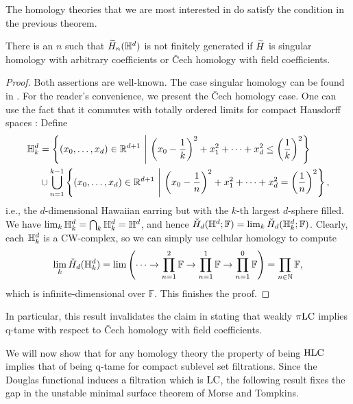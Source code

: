 The homology theories that we are most interested in do satisfy the condition in the previous theorem.

\begin{prop}
	There is an $n$ such that $\widetilde{H}_{n}(\mathbb{H}^d)$ is not finitely generated if $\widetilde{H}$ is singular homology with arbitrary coefficients or \v{C}ech homology with field coefficients.
\end{prop}

\begin{proof}
	Both assertions are well-known. The case singular homology can be found in \cite{Barratt.1962}. For the reader's convenience, we present the \v{C}ech homology case.
	One can use the fact that it commutes with totally ordered limits for compact Hausdorff spaces \cite[Theorems VIII.3.6.\@ and X.3.1.]{MR0050886}:
	Define 
	\begin{align*}
	\HE_k &= \left\{ (x_0, \dots, x_d) \in \R^{d+1} \ \middle|\  \left( x_0 - \frac{1}{k} \right)^2 + x_1^2 + \dots + x_d^2 \leq \left( \frac{1}{k} \right)^2 \right\} \\
	& \cup \bigcup_{n=1}^{k-1} \left\{ (x_0, \dots, x_d) \in \R^{d+1} \ \middle|\  \left( x_0 - \frac{1}{n} \right)^2 + x_1^2 + \dots + x_d^2 = \left( \frac{1}{n} \right)^2 \right \},
	\end{align*}
	i.e., the $d$-dimensional Hawaiian earring but with the $k$-th largest $d$-sphere filled.
	We have $\lim_{k} \mathbb{H}^d_{k} = \bigcap_{k} \mathbb{H}^d_{k} = \mathbb{H}^d$, and hence $\check{H}_{d}(\mathbb{H}^d; \mathbb{F}) = \lim_{k} \check{H}_{d}(\mathbb{H}^d_{k}; \mathbb{F})$.
	Clearly, each $\mathbb{H}^d_{k}$ is a CW-complex, so we can simply use cellular homology to compute
	\begin{equation*}
	\lim_{k}\check{H}_{d}(\mathbb{H}^{d}_{k})=\lim\left(\dots\to \prod_{n=1}^2\mathbb{F}\to \prod_{n=1}^1\mathbb{F}\to \prod_{n=1}^0\mathbb{F}\right)=\prod_{n\in\mathbb{N}}\mathbb{F},
	\end{equation*}
	which is infinite-dimensional over $\mathbb{F}$.
	This finishes the proof.
\end{proof}

In particular, this result invalidates the claim in \cite[Theorem 6.3]{Morse.1940} stating that weakly $\pi\mathrm{LC}$ implies q-tame with respect to \v{C}ech homology with field coefficients.

We will now show that for any homology theory the property of being $\mathrm{HLC}$ implies that of being q-tame for compact sublevel set filtrations.
Since the Douglas functional induces a filtration which is $\mathrm{LC}$, the following result fixes the gap in the unstable minimal surface theorem of Morse and Tompkins.

